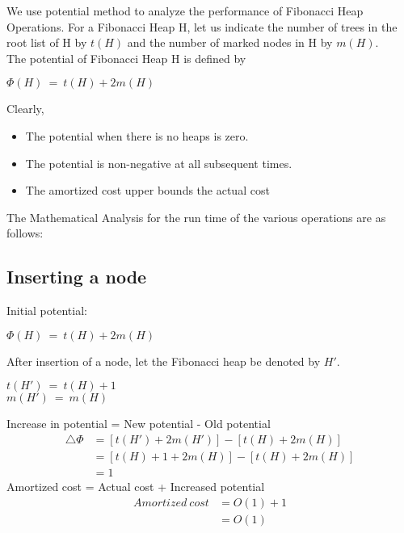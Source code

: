 We use potential method to analyze the performance of Fibonacci Heap Operations. For a Fibonacci Heap H, let us indicate the number of trees in the root list of H by $t(H)$ and the number of marked nodes in H by $m(H)$. \\ The potential of Fibonacci Heap H is defined by \\
\begin{center}
	$\Phi{(H)} \ = \ t(H) + 2m(H)$
\end{center}
Clearly,
\begin{itemize}
	\item The potential when there is no heaps is zero.
	\item The potential is non-negative at all subsequent times.
	\item The amortized cost upper bounds the actual cost
\end{itemize}

The Mathematical Analysis for the run time of the various operations are as follows:

\subsection{Inserting a node}
Initial potential:
\begin{center}
	$\Phi{(H)} \ = \ t(H) + 2m(H)$
\end{center}
After insertion of a node, let the Fibonacci heap be denoted by $H'$.
\begin{center}
$t(H') \ = \ t(H) + 1$ \\
$m(H') \ = \ m(H)$ \\
\end{center}
Increase in potential = New potential - Old potential
\begin{equation}
	\begin{split}
		\triangle{\Phi} &= [t(H')+2m(H')] - [t(H)+2m(H)]
		\\&= [t(H) + 1 + 2m(H)] - [t(H)+2m(H)]
		\\&= 1
	\end{split}
\end{equation}
Amortized cost = Actual cost + Increased potential
\begin{equation}
\begin{split}
Amortized \ cost &= O(1) + 1
\\&= O(1)
\end{split}
\end{equation}
